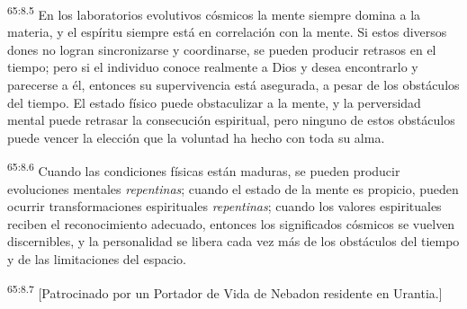 \par
\textsuperscript{65:8.5} En los laboratorios evolutivos cósmicos la mente siempre domina a la materia, y el espíritu siempre está en correlación con la mente. Si estos diversos dones no logran sincronizarse y coordinarse, se pueden producir retrasos en el tiempo; pero si el individuo conoce realmente a Dios y desea encontrarlo y parecerse a él, entonces su supervivencia está asegurada, a pesar de los obstáculos del tiempo. El estado físico puede obstaculizar a la mente, y la perversidad mental puede retrasar la consecución espiritual, pero ninguno de estos obstáculos puede vencer la elección que la voluntad ha hecho con toda su alma.

\par
\textsuperscript{65:8.6} Cuando las condiciones físicas están maduras, se pueden producir evoluciones mentales \textit{repentinas}; cuando el estado de la mente es propicio, pueden ocurrir transformaciones espirituales \textit{repentinas}; cuando los valores espirituales reciben el reconocimiento adecuado, entonces los significados cósmicos se vuelven discernibles, y la personalidad se libera cada vez más de los obstáculos del tiempo y de las limitaciones del espacio.

\par
\textsuperscript{65:8.7} [Patrocinado por un Portador de Vida de Nebadon residente en Urantia.]